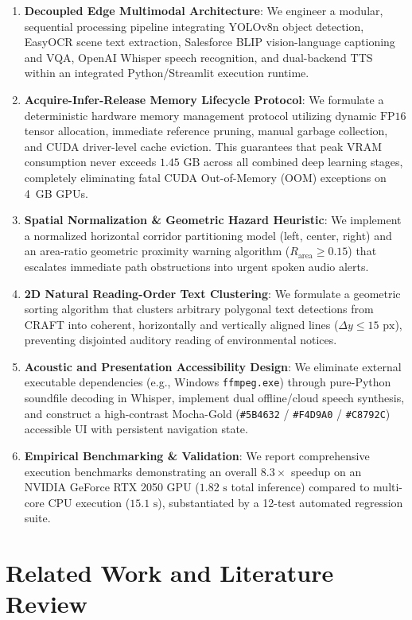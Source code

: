 \documentclass[conference]{IEEEtran}
\begin{document}
\begin{enumerate}
    \item \textbf{Decoupled Edge Multimodal Architecture}: We engineer a modular, sequential processing pipeline integrating YOLOv8n object detection, EasyOCR scene text extraction, Salesforce BLIP vision-language captioning and VQA, OpenAI Whisper speech recognition, and dual-backend TTS within an integrated Python/Streamlit execution runtime.
    \item \textbf{Acquire-Infer-Release Memory Lifecycle Protocol}: We formulate a deterministic hardware memory management protocol utilizing dynamic $\text{FP16}$ tensor allocation, immediate reference pruning, manual garbage collection, and CUDA driver-level cache eviction. This guarantees that peak VRAM consumption never exceeds $1.45\text{ GB}$ across all combined deep learning stages, completely eliminating fatal CUDA Out-of-Memory ($\text{OOM}$) exceptions on 4~GB GPUs.
    \item \textbf{Spatial Normalization \& Geometric Hazard Heuristic}: We implement a normalized horizontal corridor partitioning model (left, center, right) and an area-ratio geometric proximity warning algorithm ($R_{\text{area}} \ge 0.15$) that escalates immediate path obstructions into urgent spoken audio alerts.
    \item \textbf{2D Natural Reading-Order Text Clustering}: We formulate a geometric sorting algorithm that clusters arbitrary polygonal text detections from CRAFT into coherent, horizontally and vertically aligned lines ($\Delta y \le 15\text{ px}$), preventing disjointed auditory reading of environmental notices.
    \item \textbf{Acoustic and Presentation Accessibility Design}: We eliminate external executable dependencies (e.g., Windows \texttt{ffmpeg.exe}) through pure-Python soundfile decoding in Whisper, implement dual offline/cloud speech synthesis, and construct a high-contrast Mocha-Gold (\texttt{\#5B4632} / \texttt{\#F4D9A0} / \texttt{\#C8792C}) accessible UI with persistent navigation state.
    \item \textbf{Empirical Benchmarking \& Validation}: We report comprehensive execution benchmarks demonstrating an overall $8.3\times$ speedup on an NVIDIA GeForce RTX 2050 GPU ($1.82\text{ s}$ total inference) compared to multi-core CPU execution ($15.1\text{ s}$), substantiated by a 12-test automated regression suite.
\end{enumerate}

\section{Related Work and Literature Review}
\end{document}
